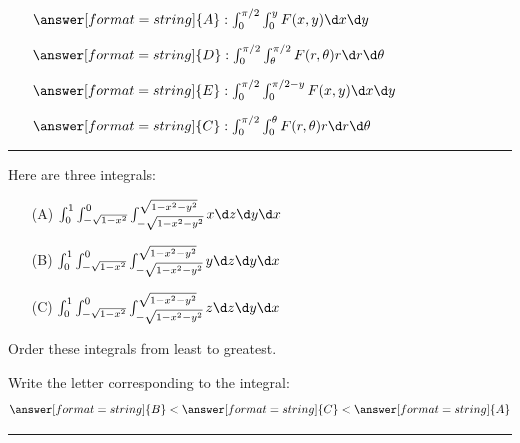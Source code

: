 \documentclass{ximera}
\begin{document}
\begin{problem}
\begin{itemize}
    \item[] $\answer[format=string]{A}: \int_0^{\pi/2} \int_{0}^{y}F(x,y) \d x\d y$
    \item[] $\answer[format=string]{D}: \int_0^{\pi/2} \int_{\theta}^{\pi/2}F(r,\theta)r \d r\d\theta$
    \item[] $\answer[format=string]{E}: \int_0^{\pi/2} \int_{0}^{\pi/2-y}F(x,y) \d x\d y$
    \item[] $\answer[format=string]{C}: \int_0^{\pi/2} \int_0^{\theta}F(r,\theta)r \d r\d \theta$
    \pdfOnly{\end{multicols}}
  \end{itemize}
\end{problem}

\hrule


\begin{problem}
  Here are three integrals:
  \begin{enumerate}
  \item[(A)] $\int_0^1 \int_{-\sqrt{1-x^2}}^0\int_{-\sqrt{1-x^2-y^2}}^{\sqrt{1-x^2-y^2}} x \d z \d y \d x$
  \item[(B)] $\int_0^1 \int_{-\sqrt{1-x^2}}^0\int_{-\sqrt{1-x^2-y^2}}^{\sqrt{1-x^2-y^2}} y \d z \d y \d x$
  \item[(C)] $\int_0^1 \int_{-\sqrt{1-x^2}}^0\int_{-\sqrt{1-x^2-y^2}}^{\sqrt{1-x^2-y^2}} z \d z \d y \d x$ 
  \end{enumerate}
  \pdfOnly{\columnbreak}
  Order these integrals from least to greatest.
  \pdfOnly{\end{multicols}}
  \begin{prompt}
    Write the letter corresponding to the integral:
    \[
    \answer[format=string]{B} < \answer[format=string]{C} < \answer[format=string]{A}
    \]
  \end{prompt}
  \end{problem}

\hrule
\end{document}
